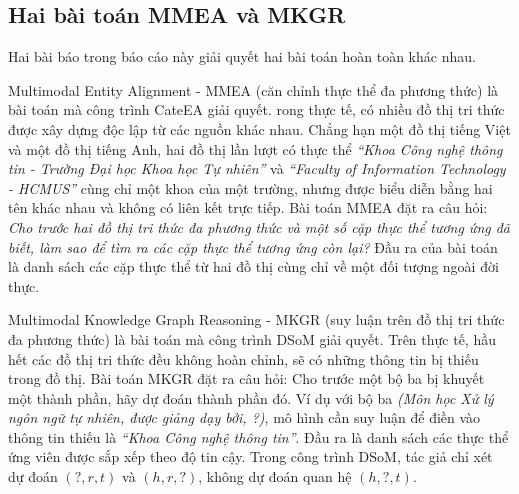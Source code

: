 \subsection{Hai bài toán MMEA và MKGR}

Hai bài báo trong báo cáo này giải quyết hai bài toán hoàn toàn khác nhau.

Multimodal Entity Alignment - MMEA (căn chỉnh thực thể đa phương thức) là bài toán mà công trình CateEA giải quyết. 
rong thực tế, có nhiều đồ thị tri thức được xây dựng độc lập từ các nguồn khác nhau.
Chẳng hạn một đồ thị tiếng Việt và một đồ thị tiếng Anh, hai đồ thị lần lượt có thực thể 
\textit{``Khoa Công nghệ thông tin - Trường Đại học Khoa học Tự nhiên''} và \textit{``Faculty of Information Technology - HCMUS''} cùng chỉ một khoa của một trường,
nhưng được biểu diễn bằng hai tên khác nhau và không có liên kết trực tiếp.
Bài toán MMEA đặt ra câu hỏi: \textit{Cho trước hai đồ thị tri thức đa phương thức và một số cặp thực thể tương ứng đã biết, làm sao để tìm ra các cặp thực thể tương ứng còn lại?}
Đầu ra của bài toán là danh sách các cặp thực thể từ hai đồ thị cùng chỉ về một đối tượng ngoài đời thực.

Multimodal Knowledge Graph Reasoning - MKGR (suy luận trên đồ thị tri thức đa phương thức) là bài toán mà công trình DSoM giải quyết.
Trên thực tế, hầu hết các đồ thị tri thức đều không hoàn chỉnh, sẽ có những thông tin bị thiếu trong đồ thị.
Bài toán MKGR đặt ra câu hỏi: Cho trước một bộ ba bị khuyết một thành phần, hãy dự đoán thành phần đó.
Ví dụ với bộ ba \textit{(Môn học Xử lý ngôn ngữ tự nhiên, được giảng dạy bởi, ?)}, mô hình cần suy luận để điền vào thông tin thiếu là \textit{``Khoa Công nghệ thông tin''}.
Đầu ra là danh sách các thực thể ứng viên được sắp xếp theo độ tin cậy. Trong công trình DSoM, tác giả chỉ xét dự đoán $(?,r,t)$ và $(h,r,?)$, không dự đoán quan hệ $(h,?,t)$.